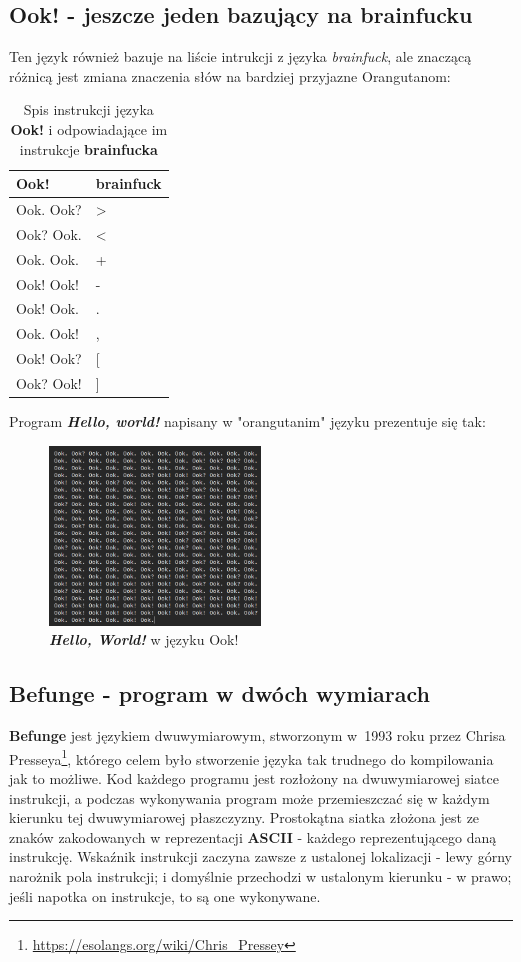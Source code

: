 \documentclass[fleqn,10pt]{SelfArx} %
\newcommand{\tabline}{\tabularnewline\hline}
\begin{document}
\subsection{Ook! - jeszcze jeden bazujący na brainfucku}
Ten język również bazuje na liście intrukcji z języka \textit{brainfuck}, ale znaczącą różnicą jest zmiana znaczenia słów
na bardziej przyjazne Orangutanom\cite{esolangWiki:ook!}:
\begin{table}[H]
	\begin{center}
		\begin{tabular}{| >{\centering}p{1.8cm} | >{\centering}p{1.5cm}|}
			\hline
			\textbf{Ook!} & \textbf{brainfuck} \tabline
			Ook. Ook? & > \tabline
			Ook? Ook. & < \tabline
			Ook. Ook. & + \tabline
			Ook! Ook! & - \tabline
			Ook! Ook. & . \tabline
			Ook. Ook! & , \tabline
			Ook! Ook? & [ \tabline
			Ook? Ook! & ] \tabline
		\end{tabular}
	\end{center}
	\caption{\centering Spis instrukcji języka \textbf{Ook!} i odpowiadające im instrukcje \textbf{brainfucka}}
	\label{tab:ook!Instrukcje}
\end{table}
Program \textbf{\textit{Hello, world!}} napisany w "orangutanim" języku prezentuje się tak:
\begin{figure}[H] %
	\centering %
	\includegraphics[width=0.5\textwidth]{Figures/ook.png} %
	\caption{\textbf{\textit{Hello, World!}} w języku Ook!}
\end{figure}

\subsection{Befunge - program w dwóch wymiarach}
\textbf{Befunge} jest językiem dwuwymiarowym, stworzonym w~1993 roku przez Chrisa Presseya\footnote{\url{https://esolangs.org/wiki/Chris_Pressey}},
którego celem było stworzenie języka tak trudnego do kompilowania jak to możliwe.
Kod każdego programu jest rozłożony na dwuwymiarowej siatce instrukcji, a podczas wykonywania program może przemieszczać się w każdym kierunku
tej dwuwymiarowej płaszczyzny. Prostokątna siatka złożona jest ze znaków zakodowanych w reprezentacji \textbf{ASCII} - każdego reprezentującego daną instrukcję.
Wskaźnik instrukcji zaczyna zawsze z ustalonej lokalizacji - lewy górny narożnik pola instrukcji; i domyślnie przechodzi w ustalonym kierunku - w prawo;
jeśli napotka on instrukcje, to są one wykonywane.
\end{document}
